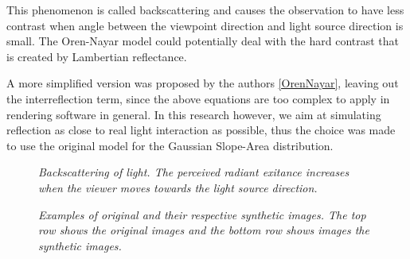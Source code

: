 This phenomenon is called backscattering and causes the observation to have less contrast when angle between the viewpoint direction and light source direction is small. The Oren-Nayar model could potentially deal with the hard contrast that is created by Lambertian reflectance.

A more simplified version was proposed by the authors \ref{OrenNayar}, leaving out the interreflection term, since the above equations are too complex to apply in rendering software in general. In this research however, we aim at simulating reflection as close to real light interaction as possible, thus the choice was made to use the original model for the Gaussian Slope-Area distribution.

\begin{figure}[ht]
	\begin{center}

	\end{center}
	\caption{{\it Backscattering of light. The perceived radiant exitance increases when the viewer moves towards the light source direction.}}
	\label{fig:Backscatter}
\end{figure}


\begin{figure}[ht]
	\begin{center}

		\label{fig:aab1}
	\end{center}
	\caption{{\it Examples of original and their respective synthetic images. The top row shows the original images and the bottom row shows images the synthetic images.}}
	\label{fig:RenderExamples2}
\end{figure}

